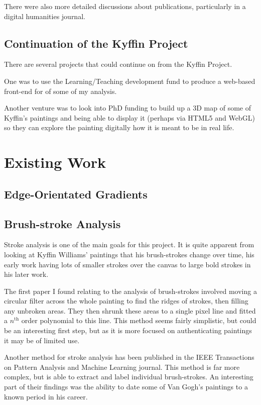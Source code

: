 There were also more detailed discussions about publications, particularly in a digital humanities
journal.


\subsection{Continuation of the Kyffin Project}

There are several projects that could continue on from the Kyffin Project.

One was to use the Learning/Teaching development fund to produce a web-based front-end for of some
of my analysis.

Another venture was to look into PhD funding to build up a 3D map of some of Kyffin's paintings
and being able to display it (perhaps via HTML5 and WebGL) so they can explore the painting 
digitally how it is meant to be in real life.



\section{Existing Work}

\subsection{Edge-Orientated Gradients}\label{sec:existing-hogs}

\subsection{Brush-stroke Analysis}\label{sec:existing-brush-stroke}
Stroke analysis is one of the main goals for this project. It is quite apparent from looking at 
Kyffin Williams' paintings that his brush-strokes change over time, his early work having lots of
smaller strokes over the canvas to large bold strokes in his later work.

The first paper I found relating to the analysis of brush-strokes involved moving a circular filter
across the whole painting to find the ridges of strokes, then filling any unbroken areas. They then
shrunk these areas to a single pixel line and fitted a $n^{\text{th}}$ order polynomial to this
line\cite{Berezhnoy2005Authentic}. This method seems fairly simplistic, but could be an interesting
first step, but as it is more focused on authenticating paintings it may be of limited use.

Another method for stroke analysis has been published in the IEEE Transactions on Pattern Analysis
and Machine Learning journal. This method is far more complex, but is able to extract and label
individual brush-strokes. An interesting part of their findings was the ability to date some of Van
Gogh's paintings to a known period in his career\cite{Li2012Rhythmic}.

